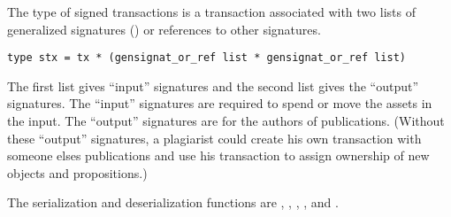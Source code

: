 The type {} of signed transactions is a transaction associated
with two lists of generalized signatures ({}) or references to other signatures.
\begin{verbatim}
type stx = tx * (gensignat_or_ref list * gensignat_or_ref list)
\end{verbatim}
The first list gives ``input'' signatures and the second list gives the ``output'' signatures.
The ``input'' signatures are required to spend or move the assets in the input.
The ``output'' signatures are for the authors of publications.
(Without these ``output'' signatures, a plagiarist could create his own transaction
with someone elses publications and use his transaction to assign ownership of
new objects and propositions.)

The serialization and deserialization functions are
{},
{},
{},
{},
{}
and
{}.

